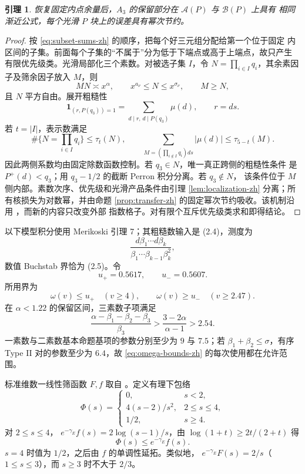 \documentclass[UTF8,10pt,a4paper]{ctexart}
\newcommand{\Acal}{\mathcal{A}}
\newcommand{\Bcal}{\mathcal{B}}
\newcommand{\1}{\mathbf{1}}
\newtheorem{lemma}[theorem]{引理}
\theoremstyle{remark}
\begin{document}
\begin{lemma}\label{lem:A3-transfer-zh}
恢复固定内点余量后，$A_3$ 的保留部分在 $\Acal(P)$ 与 $\Bcal(P)$ 上具有
相同渐近公式，每个光滑 $P$ 块上的误差具有幂次节约。
\end{lemma}

\begin{proof}
按 \eqref{eq:subset-sums-zh} 的顺序，把每个好三元组分配给第一个位于固定
内区间的子集。前面每个子集的“不属于”分为低于下端点或高于上端点，故只产生
有限优先级类。光滑局部化三个素数。对被选子集 $I$，令
$N=\prod_{i\in I}q_i$，其余素因子及筛余因子放入 $M$，则
\[
 MN\asymp x^\alpha,\qquad
 x^{a_\nu}\le N\le x^{\sigma_\nu},\qquad M\ge N,
\]
且 $N$ 平方自由。展开粗糙性
\[
 \1_{(r,P(q_3))=1}
 =\sum_{d\mid r,\,d\mid P(q_3)}\mu(d),\qquad r=ds.
\]
若 $t=|I|$，表示数满足
\[
 \#\{N=\textstyle\prod_{i\in I}q_i\}\le\tau_t(N),\qquad
 \sum_{M=(\prod_{i\notin I}q_i)ds}|\mu(d)|
 \le\tau_{5-t}(M).
\]
因此两侧系数均由固定除数函数控制。若 $q_3\in N$，唯一真正跨侧的粗糙性条件
是 $P^+(d)<q_3$；用 $q_3-1/2$ 的截断 Perron 积分分离。若 $q_3\notin N$，
该条件位于 $M$ 侧内部。素数次序、优先级和光滑产品条件由引理
\ref{lem:localization-zh} 分离；所有核损失为对数幂，并由命题
\ref{prop:transfer-zh} 的固定幂次节约吸收。该机制沿用
\cite[Sections 2.3, 2.4.3, and 3.4]{Merikoski2020}，而新的内容只改变外部
指数格子。对有限个互斥优先级类求和即得结论。
\end{proof}

以下模型积分使用 Merikoski 引理 7；其粗糙数输入是 (2.4)，测度为
\[
 \frac{d\beta_1\cdots d\beta_k}
 {\beta_1\cdots\beta_{k-1}\beta_k^2},
\]
数值 Buchstab 界恰为 (2.5)。令
\[
 u_+=0.5617,\qquad u_-=0.5607.
\]
所用界为
\begin{equation}\label{eq:omega-bounds-zh}
 \omega(v)\le u_+\quad(v\ge4),\qquad
 \omega(v)\ge u_-\quad(v\ge2.47).
\end{equation}
在 $\alpha<1.22$ 的保留区间，三素数子项满足
\[
 \frac{\alpha-\beta_1-\beta_2-\beta_3}{\beta_3}
 >\frac{3-2\alpha}{\alpha-1}>2.54.
\]
一素数与二素数基本命题基项的参数分别至少为 $9$ 与 $7.5$；若
$\beta_1+\beta_2\le\sigma$，有序 Type II 对的参数至少为 $6.4$，故
\eqref{eq:omega-bounds-zh} 的每次使用都在允许范围。

标准维数一线性筛函数 $F,f$ 取自
\cite[Chapter 12]{FriedlanderIwaniec2010}。定义有理下包络
\begin{equation}\label{eq:Phi-zh}
 \Phi(s)=
 \begin{cases}
 0,&s<2,\\
 4(s-2)/s^2,&2\le s\le4,\\
 1/2,&s\ge4.
 \end{cases}
\end{equation}
对 $2\le s\le4$，
$e^{-\gamma_E}f(s)=2\log(s-1)/s$，由
$\log(1+t)\ge2t/(2+t)$ 得
\[
 \Phi(s)\le e^{-\gamma_E}f(s).
\]
$s=4$ 时值为 $1/2$，之后由 $f$ 的单调性延拓。类似地，
$e^{-\gamma_E}F(s)=2/s$（$1\le s\le3$），而 $s\ge3$ 时不大于
$2/3$。
\end{document}
